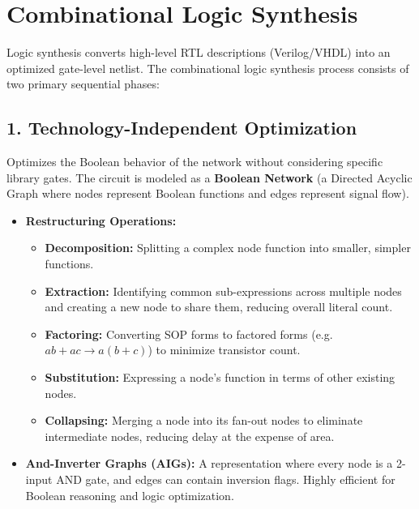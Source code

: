 \documentclass[12pt,a4paper]{article}
\begin{document}
\section{Combinational Logic Synthesis}

Logic synthesis converts high-level RTL descriptions (Verilog/VHDL) into an optimized gate-level netlist. The combinational logic synthesis process consists of two primary sequential phases:

\subsection{1. Technology-Independent Optimization}
Optimizes the Boolean behavior of the network without considering specific library gates. The circuit is modeled as a \textbf{Boolean Network} (a Directed Acyclic Graph where nodes represent Boolean functions and edges represent signal flow).
\begin{itemize}[leftmargin=*, itemsep=3pt]
  \item \textbf{Restructuring Operations:}
        \begin{itemize}[leftmargin=*, label=$\bullet$, itemsep=1.5pt]
          \item \textbf{Decomposition:} Splitting a complex node function into smaller, simpler functions.
          \item \textbf{Extraction:} Identifying common sub-expressions across multiple nodes and creating a new node to share them, reducing overall literal count.
          \item \textbf{Factoring:} Converting SOP forms to factored forms (e.g. $ab + ac \rightarrow a(b+c)$) to minimize transistor count.
          \item \textbf{Substitution:} Expressing a node's function in terms of other existing nodes.
          \item \textbf{Collapsing:} Merging a node into its fan-out nodes to eliminate intermediate nodes, reducing delay at the expense of area.
        \end{itemize}
  \item \textbf{And-Inverter Graphs (AIGs):} A representation where every node is a 2-input AND gate, and edges can contain inversion flags. Highly efficient for Boolean reasoning and logic optimization.
\end{itemize}
\end{document}
